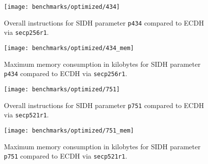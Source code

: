 \begin{figure}[H]
  \centering
  \texttt{[image: benchmarks/optimized/434]}
  \caption[Overall instructions p434]
  {Overall instructions for \gls{SIDH} parameter \texttt{p434} compared to \gls{ECDH} via \texttt{secp256r1}.}
  \label{fig:results_opt_434}
\end{figure}

\begin{figure}[H]
  \centering
  \texttt{[image: benchmarks/optimized/434\_mem]}
  \caption[Maximum memory consumption p434]
  {Maximum memory consumption in kilobytes for \gls{SIDH} parameter \texttt{p434} compared to \gls{ECDH} via \texttt{secp256r1}.}
  \label{fig:results_opt_434_mem}
\end{figure}

\begin{figure}[H]
  \centering
  \texttt{[image: benchmarks/optimized/751]}
  \caption[Overall instructions p751]
  {Overall instructions for \gls{SIDH} parameter \texttt{p751} compared to \gls{ECDH} via \texttt{secp521r1}.}
  \label{fig:results_opt_751}
\end{figure}

\begin{figure}[H]
  \centering
  \texttt{[image: benchmarks/optimized/751\_mem]}
  \caption[Maximum memory consumption 751]
  {Maximum memory consumption in kilobytes for \gls{SIDH} parameter \texttt{p751} compared to \gls{ECDH} via \texttt{secp521r1}.}
  \label{fig:results_opt_751_mem}
\end{figure}

